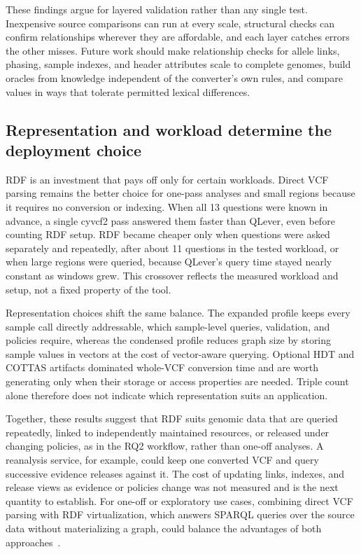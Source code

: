 \documentclass[pdflatex,sn-mathphys-num]{sn-jnl}
\begin{document}
These findings argue for layered validation rather than any single test.
Inexpensive source comparisons can run at every scale, structural checks can confirm relationships wherever they are affordable, and each layer catches errors the other misses.
Future work should make relationship checks for allele links, phasing, sample indexes, and header attributes scale to complete genomes, build oracles from knowledge independent of the converter's own rules, and compare values in ways that tolerate permitted lexical differences.


\subsection{Representation and workload determine the deployment choice}\label{subsec:disc-deployment}
RDF is an investment that pays off only for certain workloads.
Direct VCF parsing remains the better choice for one-pass analyses and small regions because it requires no conversion or indexing.
When all 13 questions were known in advance, a single cyvcf2 pass answered them faster than QLever, even before counting RDF setup.
RDF became cheaper only when questions were asked separately and repeatedly, after about 11 questions in the tested workload, or when large regions were queried, because QLever's query time stayed nearly constant as windows grew.
This crossover reflects the measured workload and setup, not a fixed property of the tool.

Representation choices shift the same balance.
The expanded profile keeps every sample call directly addressable, which sample-level queries, validation, and policies require, whereas the condensed profile reduces graph size by storing sample values in vectors at the cost of vector-aware querying.
Optional HDT and COTTAS artifacts dominated whole-VCF conversion time and are worth generating only when their storage or access properties are needed.
Triple count alone therefore does not indicate which representation suits an application.

Together, these results suggest that RDF suits genomic data that are queried repeatedly, linked to independently maintained resources, or released under changing policies, as in the RQ2 workflow, rather than one-off analyses.
A reanalysis service, for example, could keep one converted VCF and query successive evidence releases against it.
The cost of updating links, indexes, and release views as evidence or policies change was not measured and is the next quantity to establish.
For one-off or exploratory use cases, combining direct VCF parsing with RDF virtualization, which answers SPARQL queries over the source data without materializing a graph, could balance the advantages of both approaches~\cite{xiao2019vkg}.
\end{document}
